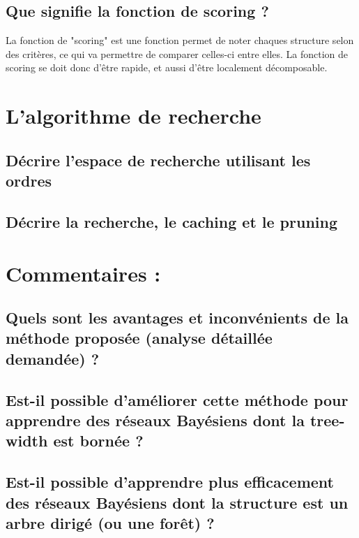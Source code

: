 \documentclass[french,a4paper]{article}
\begin{document}
\subsection{Que signifie la fonction de scoring ?}
La fonction de "scoring" est une fonction permet de noter chaques structure selon des critères, ce qui va permettre de comparer celles-ci entre elles.
La fonction de scoring se doit donc d'être rapide, et aussi d'être localement décomposable.

\section{L'algorithme de recherche}
\subsection{Décrire l'espace de recherche utilisant les ordres}


\subsection{Décrire la recherche, le caching et le pruning}


\section{Commentaires :}
\subsection{Quels sont les avantages et inconvénients de la méthode proposée (analyse détaillée demandée) ?}
\subsection{Est-il possible d'améliorer cette méthode pour apprendre des réseaux Bayésiens dont la tree-width est bornée ?}
\subsection{Est-il possible d'apprendre plus efficacement des réseaux Bayésiens dont la structure est un arbre dirigé (ou une forêt) ?}
\end{document}
